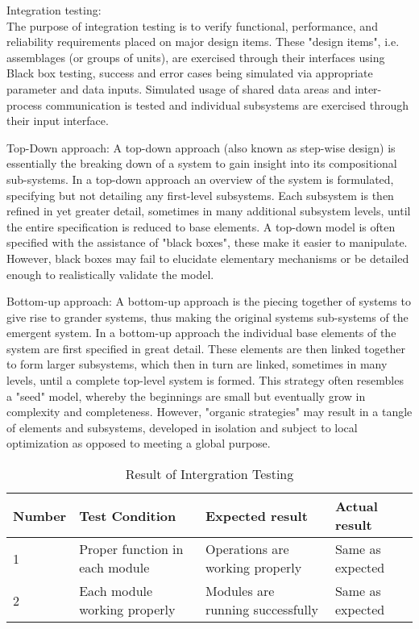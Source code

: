 Integration testing:\\
The purpose of integration testing is to verify functional, performance, and reliability requirements placed on major design items. These "design items", i.e. assemblages (or groups of units), are exercised through their interfaces using Black box testing, success and error cases being simulated via appropriate parameter and data inputs. Simulated usage of shared data areas and inter-process communication is tested and individual subsystems are exercised through their input interface.

Top-Down approach:
	A top-down approach (also known as step-wise design) is essentially the breaking down of a system to gain insight into its compositional sub-systems. In a top-down approach an overview of the system is formulated, specifying but not detailing any first-level subsystems. Each subsystem is then refined in yet greater detail, sometimes in many additional subsystem levels, until the entire specification is reduced to base elements. A top-down model is often specified with the assistance of "black boxes", these make it easier to manipulate. However, black boxes may fail to elucidate elementary mechanisms or be detailed enough to realistically validate the model.


Bottom-up approach:
         A bottom-up approach is the piecing together of systems to give rise to grander systems, thus making the original systems sub-systems of the emergent system. In a bottom-up approach the individual base elements of the system are first specified in great detail. These elements are then linked together to form larger subsystems, which then in turn are linked, sometimes in many levels, until a complete top-level system is formed. This strategy often resembles a "seed" model, whereby the beginnings are small but eventually grow in complexity and completeness. However, "organic strategies" may result in a tangle of elements and subsystems, developed in isolation and subject to local optimization as opposed to meeting a global purpose.

\begin{table}[h]
\centering
\begin{tabular}{|l|l|l|l|} 
\hline 
Number & Test Condition & Expected result & Actual result\\
\hline
1 & Proper function in each module & Operations are working properly & Same as expected\\
\hline
2 & Each module working properly &  Modules are running successfully & Same as expected\\
\hline	
\end{tabular} 
\caption{Result of Intergration Testing}

\end{table}



